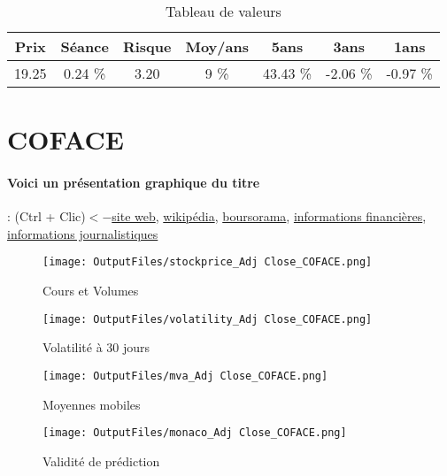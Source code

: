 \documentclass[11pt,a4paper]{report}%
\begin{document}
\begin{table}[H]
  \centering
    \begin{tabular}{|c|c|c|c|c|c|c|}
    \hline
    Prix & Séance & Risque  & Moy/ans & 5ans & 3ans & 1ans \\
    \hline
    19.25 &    0.24 \%    & 3.20 & 9 \% & 43.43 \% & -2.06 \% & -0.97 \% \\
    \hline
    \end{tabular}%
        \label{tab:table_AXA}%
      \caption{Tableau de valeurs}
\end{table}%

\newpage

\section{COFACE}

\paragraph{Voici un présentation graphique du titre} : (Ctrl + Clic)$<-$\href{https://www.coface.com/fr/Investisseurs}{site web}, \href{https://fr.wikipedia.org/wiki/Compagnie_fran%C3%A7aise_d%27assurance_pour_le_commerce_ext%C3%A9rieur}{wikipédia}, \href{https://www.boursorama.com/cours/1rPCOFA/}{boursorama}, \href{https://www.qwant.com/?q=site:https:%2f%2fwww.easybourse.com%2faction-societe%2fCOFACE&t=web&client=ext-firefox-hp}{informations financières}, \href{https://bourse.lerevenu.com/cours-de-bourse/fiche-valeur-synthese/COFACE/COFA-FR}{informations journalistiques}
\begin{figure}[!htb]
   \begin{minipage}{0.5\textwidth}
     \centering
     \texttt{[image: OutputFiles/stockprice\_Adj Close\_COFACE.png]}
     \caption{Cours et Volumes}\label{Fig:price_COFACE}
   \end{minipage}\hfill
   \begin{minipage}{0.5\textwidth}
     \centering
     \texttt{[image: OutputFiles/volatility\_Adj Close\_COFACE.png]}
     \caption{Volatilité à 30 jours}\label{Fig:volat_COFACE}
   \end{minipage}
\end{figure}
\begin{figure}[!htb]
   \begin{minipage}{0.5\textwidth}
     \centering
     \texttt{[image: OutputFiles/mva\_Adj Close\_COFACE.png]}
     \caption{Moyennes mobiles}\label{Fig:mva_COFACE}
   \end{minipage}\hfill
   \begin{minipage}{0.5\textwidth}
     \centering
     \texttt{[image: OutputFiles/monaco\_Adj Close\_COFACE.png]}
     \caption{Validité de prédiction}\label{Fig:prediction_COFACE}
   \end{minipage}
\end{figure}
\end{document}
